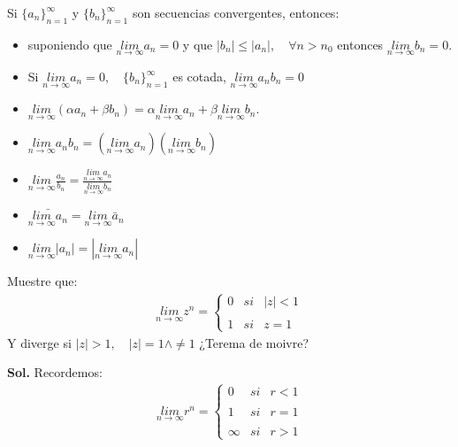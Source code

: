 \documentclass{article}
\newcommand{\caja}[3]{%
  \begin{tcolorbox}[colback=#1!5!white,colframe=#1!25!black,title=#2]
    #3
  \end{tcolorbox}%
}
\begin{document}
\caja{green}{Teorema }{
  Si $ \{a_n \}_{n=1 } ^ {\infty} $ y $ \{b_n\}_{n=1 } ^ {\infty} $ son secuencias convergentes, entonces: 
  \begin{itemize}
    \item suponiendo que $ \underset{n \rightarrow \infty}{lim }a_n = 0  $ y que $ \left|b_n \right|\leq \left|a_n \right|, \quad \forall n>n_0  $ entonces $ \underset{n \rightarrow \infty}{lim }b_n = 0  $.
    \item Si $ \underset{n \rightarrow \infty}{lim }a_n = 0, \quad \{b_n \}_{n=1 } ^ {\infty} $ es cotada, $ \underset{n \rightarrow \infty}{lim }a_n b_n  = 0  $
    \item $ \underset{n \rightarrow  \infty}{lim }(\alpha a_n + \beta b_n ) = \alpha \underset{n \rightarrow \infty}{lim }a_n + \beta \underset{n \rightarrow \infty}{lim }b_n $.
    \item $ \underset{n \rightarrow \infty}{lim }a_n b_n  = \left(\underset{n \rightarrow  \infty}{lim }a_n \right)\left(\underset{n \rightarrow \infty}{lim }b_n \right) $
    \item $ \underset{n \rightarrow  \infty}{lim} \frac{a_n }{b_n } = \frac{\underset{n \rightarrow \infty}{lim }a_n }{\underset{n \rightarrow \infty}{lim }b_n} $
    \item $ \bar{\underset{n \rightarrow \infty}{lim}a_n} = \underset{n \rightarrow \infty}{lim }\bar a_n $
    \item $ \underset{n \rightarrow \infty}{lim }\left|a_n \right| = \left|\underset{n \rightarrow \infty}{lim }a_n \right| $
  \end{itemize}
}

\caja{blue}{Ejercicio }{
  Muestre que:
  \begin{gather}
    \underset{n \rightarrow \infty}{lim }z ^ {n } = \left\{ \begin{array}{lcc} 0 & si & |z| <1 \\ \\ 1 & si & z=1\end{array} \right. 
  \end{gather}
  Y diverge si $ |z| > 1, \quad |z| = 1 \wedge \neq 1 $
  \tcblower
  ¿Terema de moivre?
}
\textbf{Sol. } Recordemos:
\begin{gather}
  \underset{n \rightarrow \infty}{lim }r ^ {n } = \left\{ \begin{array}{lcc} 0 & si & r <1 \\ \\ 1 & si & r=1 \\ \\ \infty & si & r>1\end{array} \right. 
\end{gather}
\end{document}
